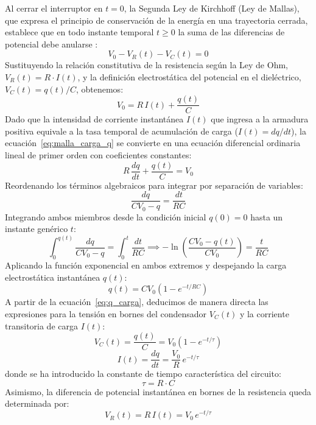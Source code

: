Al cerrar el interruptor en $t = 0$, la Segunda Ley de Kirchhoff (Ley de Mallas), que expresa el principio de conservación de la energía en una trayectoria cerrada, establece que en todo instante temporal $t \ge 0$ la suma de las diferencias de potencial debe anularse \cite{serway}:
\begin{equation}
    V_0 - V_R(t) - V_C(t) = 0
    \label{eq:malla_carga}
\end{equation}
Sustituyendo la relación constitutiva de la resistencia según la Ley de Ohm, $V_R(t) = R \cdot I(t)$, y la definición electrostática del potencial en el dieléctrico, $V_C(t) = q(t)/C$, obtenemos:
\begin{equation}
    V_0 = R\,I(t) + \frac{q(t)}{C}
    \label{eq:malla_carga_q}
\end{equation}
Dado que la intensidad de corriente instantánea $I(t)$ que ingresa a la armadura positiva equivale a la tasa temporal de acumulación de carga ($I(t) = dq/dt$), la ecuación~\eqref{eq:malla_carga_q} se convierte en una ecuación diferencial ordinaria lineal de primer orden con coeficientes constantes:
\begin{equation}
    R\,\frac{dq}{dt} + \frac{q(t)}{C} = V_0
    \label{eq:edo_carga}
\end{equation}
Reordenando los términos algebraicos para integrar por separación de variables:
\begin{equation}
    \frac{dq}{C V_0 - q} = \frac{dt}{R C}
\end{equation}
Integrando ambos miembros desde la condición inicial $q(0) = 0$ hasta un instante genérico $t$:
\begin{equation}
    \int_{0}^{q(t)} \frac{dq}{C V_0 - q} = \int_{0}^{t} \frac{dt}{R C} \implies -\ln\left(\frac{C V_0 - q(t)}{C V_0}\right) = \frac{t}{R C}
\end{equation}
Aplicando la función exponencial en ambos extremos y despejando la carga electrostática instantánea $q(t)$:
\begin{equation}
    q(t) = C V_0 \left( 1 - e^{-t / RC} \right)
    \label{eq:q_carga}
\end{equation}
A partir de la ecuación~\eqref{eq:q_carga}, deducimos de manera directa las expresiones para la tensión en bornes del condensador $V_C(t)$ y la corriente transitoria de carga $I(t)$:
\begin{equation}
    V_C(t) = \frac{q(t)}{C} = V_0 \left( 1 - e^{-t / \tau} \right)
    \label{eq:vc_carga}
\end{equation}
\begin{equation}
    I(t) = \frac{dq}{dt} = \frac{V_0}{R}\,e^{-t / \tau}
    \label{eq:i_carga}
\end{equation}
donde se ha introducido la constante de tiempo característica del circuito:
\begin{equation}
    \tau = R \cdot C
    \label{eq:def_tau}
\end{equation}
Asimismo, la diferencia de potencial instantánea en bornes de la resistencia queda determinada por:
\begin{equation}
    V_R(t) = R\,I(t) = V_0\,e^{-t / \tau}
    \label{eq:vr_carga}
\end{equation}

